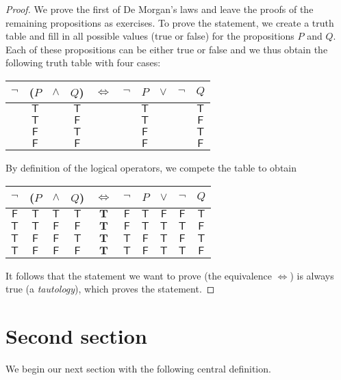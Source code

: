 \documentclass[11pt]{linearbook}
\begin{document}
\begin{proof}
  \newcommand{\T}{\mathsf{T}}
  \newcommand{\TT}{\mathbf{T}}
  \renewcommand{\F}{\mathsf{F}}
  We prove the first of De Morgan's laws and leave the proofs of
  the remaining propositions as exercises. To prove the statement,
  we create a truth table and fill in all possible values (true or
  false) for the propositions $P$ and $Q$. Each of these propositions
  can be either true or false and we thus obtain the following truth
  table with four cases:
  \begin{center}
    \begin{tabular}{cccccccccc}
      $\lnot$ & ($P$ & $\land$ & $Q$) & $\Leftrightarrow$ & $\lnot$ & $P$ & $\lor$ & $\lnot$ & $Q$ \\
      \midrule
      & $\T$ && $\T$ &&& $\T$ &&& $\T$ \\
      & $\T$ && $\F$ &&& $\T$ &&& $\F$ \\
      & $\F$ && $\T$ &&& $\F$ &&& $\T$ \\
      & $\F$ && $\F$ &&& $\F$ &&& $\F$
    \end{tabular}
  \end{center}
  By definition of the logical operators, we compete the table to obtain
  \begin{center}
    \begin{tabular}{cccccccccc}
      $\lnot$ & ($P$ & $\land$ & $Q$) & $\Leftrightarrow$ & $\lnot$ & $P$ & $\lor$ & $\lnot$ & $Q$ \\
      \midrule
      $\F$ & $\T$ & $\T$ & $\T$ & $\TT$ & $\F$ & $\T$ & $\F$ & $\F$& $\T$ \\
      $\T$ & $\T$ & $\F$ & $\F$ & $\TT$ & $\F$ & $\T$ & $\T$ & $\T$& $\F$ \\
      $\T$ & $\F$ & $\F$ & $\T$ & $\TT$ & $\T$ & $\F$ & $\T$ & $\F$& $\T$ \\
      $\T$ & $\F$ & $\F$ & $\F$ & $\TT$ & $\T$ & $\F$ & $\T$ & $\T$& $\F$
    \end{tabular}
  \end{center}
  It follows that the statement we want to prove (the equivalence $\Leftrightarrow$)
  is always true (a \emph{tautology}), which proves the statement.
\end{proof}

\section{Second section}

We begin our next section with the following central definition.
\end{document}
